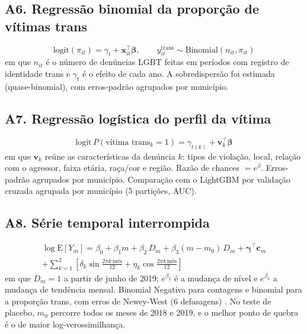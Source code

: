 \documentclass[12pt]{article}
\begin{document}
\subsection*{A6. Regressão binomial da proporção de vítimas trans}
\begin{equation*}
\text{logit}\!\left(\pi_{it}\right) = \gamma_t + \mathbf{x}_{it}^{\top}\boldsymbol{\beta}, \qquad
y^{\text{trans}}_{it} \sim \text{Binomial}(n_{it}, \pi_{it})
\end{equation*}
em que $n_{it}$ é o número de denúncias LGBT feitas em períodos com registro de identidade trans e $\gamma_t$ é o efeito de cada ano. A sobredispersão foi estimada (quase-binomial), com erros-padrão agrupados por município.

\subsection*{A7. Regressão logística do perfil da vítima}
\begin{equation*}
\text{logit}\, P(\text{vítima trans}_k = 1) = \gamma_{t(k)} + \mathbf{v}_k^{\top}\boldsymbol{\beta}
\end{equation*}
em que $\mathbf{v}_k$ reúne as características da denúncia $k$: tipos de violação, local, relação com o agressor, faixa etária, raça/cor e região. Razão de chances $=e^{\beta}$. Erros-padrão agrupados por município. Comparação com o LightGBM por validação cruzada agrupada por município (5 partições, AUC).

\subsection*{A8. Série temporal interrompida}
\begin{multline*}
\log \mathrm{E}[Y_m] = \beta_0 + \beta_1 m + \beta_2\, D_m + \beta_3 (m-m_0)\, D_m + \boldsymbol{\gamma}^{\top}\mathbf{c}_m \\
+ \sum_{k=1}^{2}\left[\delta_k \sin\tfrac{2\pi k\, \text{mês}}{12} + \eta_k \cos\tfrac{2\pi k\, \text{mês}}{12}\right]
\end{multline*}
em que $D_m=1$ a partir de junho de 2019; $e^{\beta_2}$ é a mudança de nível e $e^{\beta_3}$ a mudança de tendência mensal. Binomial Negativa para contagens e binomial para a proporção trans, com erros de Newey-West (6 defasagens) \cite{bernal:2017}. No teste de placebo, $m_0$ percorre todos os meses de 2018 e 2019, e o melhor ponto de quebra é o de maior log-verossimilhança.
\end{document}
